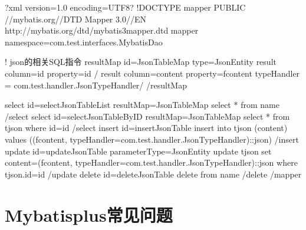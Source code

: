\documentclass[letterpaper,10pt,english]{sphinxmanual}
\begin{document}
\begin{sphinxVerbatim}[commandchars=\\\{\}]
\PYGZlt{}?xml version=\PYGZdq{}1.0\PYGZdq{} encoding=\PYGZdq{}UTF\PYGZhy{}8\PYGZdq{}?\PYGZgt{}
\PYGZlt{}!DOCTYPE mapper
PUBLIC \PYGZdq{}\PYGZhy{}//mybatis.org//DTD Mapper 3.0//EN\PYGZdq{}
\PYGZdq{}http://mybatis.org/dtd/mybatis\PYGZhy{}3\PYGZhy{}mapper.dtd\PYGZdq{}\PYGZgt{}
\PYGZlt{}mapper namespace=\PYGZdq{}com.test.interfaces.MybatisDao\PYGZdq{}\PYGZgt{}


   \PYGZlt{}!\PYGZhy{}\PYGZhy{} json的相关SQL指令 \PYGZhy{}\PYGZhy{}\PYGZgt{}
   \PYGZlt{}resultMap id=\PYGZdq{}JsonTableMap\PYGZdq{} type=\PYGZdq{}JsonEntity\PYGZdq{}\PYGZgt{}
       \PYGZlt{}result column=\PYGZdq{}id\PYGZdq{} property=\PYGZdq{}id\PYGZdq{} /\PYGZgt{}
       \PYGZlt{}result column=\PYGZdq{}content\PYGZdq{} property=\PYGZdq{}fcontent\PYGZdq{} typeHandler = \PYGZdq{}com.test.handler.JsonTypeHandler\PYGZdq{}/\PYGZgt{}
   \PYGZlt{}/resultMap\PYGZgt{}

   \PYGZlt{}select id=\PYGZdq{}selectJsonTableList\PYGZdq{} resultMap=\PYGZdq{}JsonTableMap\PYGZdq{}\PYGZgt{}
      select * from \PYGZdl{}\PYGZob{}name\PYGZcb{}
   \PYGZlt{}/select\PYGZgt{}
   \PYGZlt{}select id=\PYGZdq{}selectJsonTableByID\PYGZdq{} resultMap=\PYGZdq{}JsonTableMap\PYGZdq{}\PYGZgt{}
      select * from t\PYGZus{}json where id=\PYGZsh{}\PYGZob{}id\PYGZcb{}
   \PYGZlt{}/select\PYGZgt{}
    \PYGZlt{}insert id=\PYGZdq{}insertJsonTable\PYGZdq{}\PYGZgt{}
        insert into t\PYGZus{}json (content) values ((\PYGZsh{}\PYGZob{}fcontent, typeHandler=com.test.handler.JsonTypeHandler\PYGZcb{})::json)
    \PYGZlt{}/insert\PYGZgt{}
    \PYGZlt{}update id=\PYGZdq{}updateJsonTable\PYGZdq{} parameterType=\PYGZdq{}JsonEntity\PYGZdq{} \PYGZgt{}
        update t\PYGZus{}json set content=(\PYGZsh{}\PYGZob{}fcontent, typeHandler=com.test.handler.JsonTypeHandler\PYGZcb{})::json where t\PYGZus{}json.id=\PYGZsh{}\PYGZob{}id\PYGZcb{}
    \PYGZlt{}/update\PYGZgt{}
    \PYGZlt{}delete id=\PYGZdq{}deleteJsonTable\PYGZdq{}\PYGZgt{}
        delete from \PYGZdl{}\PYGZob{}name\PYGZcb{}
    \PYGZlt{}/delete\PYGZgt{}
\PYGZlt{}/mapper\PYGZgt{}
\end{sphinxVerbatim}


\section{Mybatis\sphinxhyphen{}plus常见问题}
\label{\detokenize{interface/mybatis-plus:mybatis-plus}}\label{\detokenize{interface/mybatis-plus::doc}}
\end{document}

